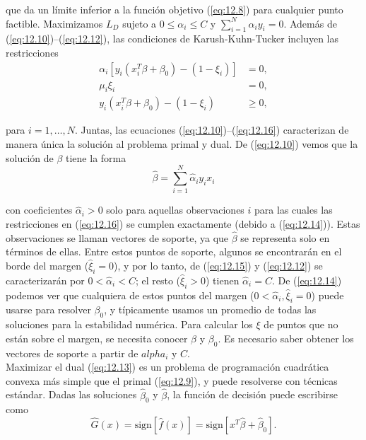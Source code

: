 \noindent que da un límite inferior a la función objetivo (\ref{eq:12.8}) para cualquier punto factible. Maximizamos $L_D$ sujeto a $0 \leq \alpha_i \leq C$ y $\sum_{i=1}^N \alpha_i y_i = 0$. Además de (\ref{eq:12.10})–(\ref{eq:12.12}), las condiciones de Karush-Kuhn-Tucker incluyen las restricciones
\begin{align}
\alpha_i [y_i (x_i^T \beta + \beta_0) - (1 - \xi_i)] &= 0, \label{eq:12.14}\\
\mu_i \xi_i &= 0, \label{eq:12.15} \\
y_i (x_i^T \beta + \beta_0) - (1 - \xi_i) &\geq 0, \label{eq:12.16}
\end{align}

\noindent para $i = 1, \ldots, N$. Juntas, las ecuaciones (\ref{eq:12.10})–(\ref{eq:12.16}) caracterizan de manera única la solución al problema primal y dual. De (\ref{eq:12.10}) vemos que la solución de $\beta$ tiene la forma 
\begin{equation}
\hat{\beta} = \sum_{i=1}^N \hat{\alpha}_i y_i x_i
\label{eq:12.17}    
\end{equation}

\noindent con coeficientes $\hat{\alpha}_i > 0$ solo para aquellas observaciones $i$ para las cuales las restricciones en (\ref{eq:12.16}) se cumplen exactamente (debido a (\ref{eq:12.14})). Estas observaciones se llaman vectores de soporte, ya que $\hat{\beta}$ se representa solo en términos de ellas. Entre estos puntos de soporte, algunos se encontrarán en el borde del margen ($\hat{\xi}_i = 0$), y por lo tanto, de (\ref{eq:12.15}) y (\ref{eq:12.12}) se caracterizarán por $0 < \hat{\alpha}_i < C$; el resto ($\hat{\xi}_i > 0$) tienen $\hat{\alpha}_i = C$. De (\ref{eq:12.14}) podemos ver que cualquiera de estos puntos del margen ($0 < \hat{\alpha}_i, \hat{\xi}_i = 0$) puede usarse para resolver $\beta_0$, y típicamente usamos un promedio de todas las soluciones para la estabilidad numérica. Para calcular los $\xi$ de puntos que no están sobre el margen, se necesita conocer $\beta$ y $\beta_0$. Es necesario saber obtener los vectores de soporte a partir de $alpha_i$ y $C$. \\

Maximizar el dual (\ref{eq:12.13}) es un problema de programación cuadrática convexa más simple que el primal (\ref{eq:12.9}), y puede resolverse con técnicas estándar. Dadas las soluciones $\hat{\beta}_0$ y $\hat{\beta}$, la función de decisión puede escribirse como
\begin{equation}
    \hat{G}(x) = \text{sign}[\hat{f}(x)] = \text{sign}[x^T\hat{\beta} + \hat{\beta}_0].
\end{equation}

